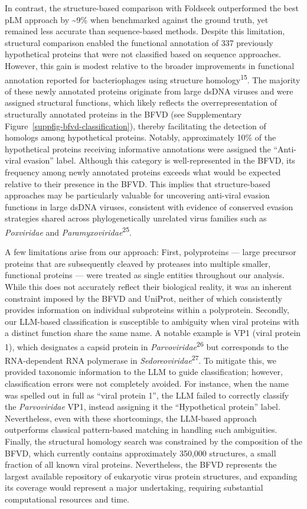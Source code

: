 \documentclass[
  sn-nature,
]{sn-jnl}
\begin{document}
In contrast, the structure-based comparison with Foldseek outperformed
the best pLM approach by \textasciitilde9\% when benchmarked against the
ground truth, yet remained less accurate than sequence-based methods.
Despite this limitation, structural comparison enabled the functional
annotation of 337 previously hypothetical proteins that were not
classified based on sequence approaches. However, this gain is modest
relative to the broader improvements in functional annotation reported
for bacteriophages using structure homology\textsuperscript{15}. The
majority of these newly annotated proteins originate from large dsDNA
viruses and were assigned structural functions, which likely reflects
the overrepresentation of structurally annotated proteins in the BFVD
(see Supplementary Figure~\ref{suppfig-bfvd-classification}), thereby
facilitating the detection of homologs among hypothetical proteins.
Notably, approximately 10\% of the hypothetical proteins receiving
informative annotations were assigned the ``Anti-viral evasion'' label.
Although this category is well-represented in the BFVD, its frequency
among newly annotated proteins exceeds what would be expected relative
to their presence in the BFVD. This implies that structure-based
approaches may be particularly valuable for uncovering anti-viral
evasion functions in large dsDNA viruses, consistent with evidence of
conserved evasion strategies shared across phylogenetically unrelated
virus families such as \emph{Poxviridae} and
\emph{Paramyxoviridae}\textsuperscript{25}.

A few limitations arise from our approach: First, polyproteins --- large
precursor proteins that are subsequently cleaved by proteases into
multiple smaller, functional proteins --- were treated as single
entities throughout our analysis. While this does not accurately reflect
their biological reality, it was an inherent constraint imposed by the
BFVD and UniProt, neither of which consistently provides information on
individual subproteins within a polyprotein. Secondly, our LLM-based
classification is susceptible to ambiguity when viral proteins with a
distinct function share the same name. A notable example is VP1 (viral
protein 1), which designates a capsid protein in
\emph{Parvoviridae}\textsuperscript{26} but corresponds to the
RNA-dependent RNA polymerase in
\emph{Sedoreoviridae}\textsuperscript{27}. To mitigate this, we provided
taxonomic information to the LLM to guide classification; however,
classification errors were not completely avoided. For instance, when
the name was spelled out in full as ``viral protein 1'', the LLM failed
to correctly classify the \emph{Parvoviridae} VP1, instead assigning it
the ``Hypothetical protein'' label. Nevertheless, even with these
shortcomings, the LLM-based approach outperforms classical pattern-based
matching in handling such ambiguities. Finally, the structural homology
search was constrained by the composition of the BFVD, which currently
contains approximately 350,000 structures, a small fraction of all known
viral proteins. Nevertheless, the BFVD represents the largest available
repository of eukaryotic virus protein structures, and expanding its
coverage would represent a major undertaking, requiring substantial
computational resources and time.
\end{document}
